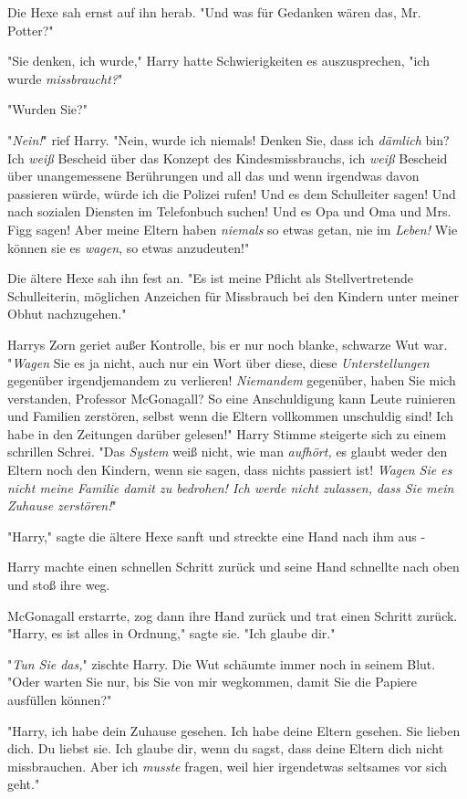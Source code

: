 {Die Hexe sah ernst auf ihn herab. "Und was für Gedanken wären das, Mr. Potter?"

"Sie denken, ich wurde," Harry hatte Schwierigkeiten es auszusprechen, "ich wurde \emph{missbraucht?}"

"Wurden Sie?"

"\emph{Nein!}" rief Harry. "Nein, wurde ich niemals! Denken Sie, dass ich \emph{dämlich} bin? Ich \emph{weiß} Bescheid über das Konzept des Kindesmissbrauchs, ich \emph{weiß} Bescheid über unangemessene Berührungen und all das und wenn irgendwas davon passieren würde, würde ich die Polizei rufen! Und es dem Schulleiter sagen! Und nach sozialen Diensten im Telefonbuch suchen! Und es Opa und Oma und Mrs. Figg sagen! Aber meine Eltern haben \emph{niemals} so etwas getan, nie im \emph{Leben!} Wie können sie es \emph{wagen}, so etwas anzudeuten!"

Die ältere Hexe sah ihn fest an. "Es ist meine Pflicht als Stellvertretende Schulleiterin, möglichen Anzeichen für Missbrauch bei den Kindern unter meiner Obhut nachzugehen."

Harrys Zorn geriet außer Kontrolle, bis er nur noch blanke, schwarze Wut war. "\emph{Wagen} Sie es ja nicht, auch nur ein Wort über diese, diese \emph{Unterstellungen} gegenüber irgendjemandem zu verlieren! \emph{Niemandem} gegenüber, haben Sie mich verstanden, Professor McGonagall? So eine Anschuldigung kann Leute ruinieren und Familien zerstören, selbst wenn die Eltern vollkommen unschuldig sind! Ich habe in den Zeitungen darüber gelesen!" Harry Stimme steigerte sich zu einem schrillen Schrei. "Das \emph{System} weiß nicht, wie man \emph{aufhört,} es glaubt weder den Eltern noch den Kindern, wenn sie sagen, dass nichts passiert ist! \emph{Wagen Sie es nicht meine Familie damit zu bedrohen! Ich werde nicht zulassen, dass Sie mein} \emph{Zuhause zerstören!}"

"Harry," sagte die ältere Hexe sanft und streckte eine Hand nach ihm aus -

Harry machte einen schnellen Schritt zurück und seine Hand schnellte nach oben und stoß ihre weg.

McGonagall erstarrte, zog dann ihre Hand zurück und trat einen Schritt zurück. "Harry, es ist alles in Ordnung," sagte sie. "Ich glaube dir."

"\emph{Tun Sie das,}" zischte Harry. Die Wut schäumte immer noch in seinem Blut. "Oder warten Sie nur, bis Sie von mir wegkommen, damit Sie die Papiere ausfüllen können?"

"Harry, ich habe dein Zuhause gesehen. Ich habe deine Eltern gesehen. Sie lieben dich. Du liebst sie. Ich glaube dir, wenn du sagst, dass deine Eltern dich nicht missbrauchen. Aber ich \emph{musste} fragen, weil hier irgendetwas seltsames vor sich geht."

}
